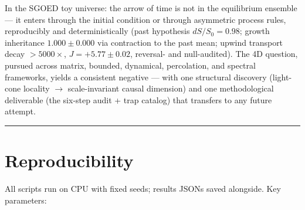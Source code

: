\documentclass[12pt,a4paper]{article}
\begin{document}
In the SGOED toy universe: the arrow of time is not in the equilibrium
ensemble --- it enters through the initial condition or through
asymmetric process rules, reproducibly and deterministically (past
hypothesis \(dS/S_0=0.98\); growth inheritance \(1.000\pm0.000\) via
contraction to the past mean; upwind transport decay \(>5000\times\),
\(J=+5.77\pm0.02\), reversal- and null-audited). The 4D question,
pursued across matrix, bounded, dynamical, percolation, and spectral
frameworks, yields a consistent negative --- with one structural
discovery (light-cone locality $\rightarrow$ scale-invariant causal dimension) and
one methodological deliverable (the six-step audit + trap catalog) that
transfers to any future attempt.

\begin{center}\rule{0.5\linewidth}{0.5pt}\end{center}

\appendix
\section{Reproducibility}\label{appendix-a-reproducibility}\begingroup\small\sloppy

All scripts run on CPU with fixed seeds; results JSONs saved alongside.
Key parameters:
\end{document}
